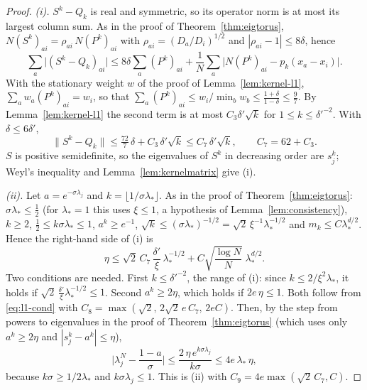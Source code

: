 \begin{proof}
\emph{(i).} $S^k-Q_k$ is real and symmetric, so its operator norm is at most its largest column sum. As in
the proof of Theorem~\ref{thm:eigtorus}, $N(S^k)_{ai}=\rho_{ai}\,N(P^k)_{ai}$ with
$\rho_{ai}=(D_a/D_i)^{1/2}$ and $|\rho_{ai}-1|\le8\delta$, hence
\[
 \sum_a\big|(S^k-Q_k)_{ai}\big|\le8\delta\sum_a(P^k)_{ai}+\frac1N\sum_a\big|N(P^k)_{ai}-p_k(x_a-x_i)\big| .
\]
With the stationary weight $w$ of the proof of Lemma~\ref{lem:kernel-l1}, $\sum_aw_a(P^k)_{ai}=w_i$, so
that $\sum_a(P^k)_{ai}\le w_i/\min_bw_b\le\frac{1+\delta}{1-\delta}\le\frac97$. By
Lemma~\ref{lem:kernel-l1} the second term is at most $C_3\delta'\sqrt k$ for $1\le k\le\delta'^{-2}$. With
$\delta\le6\delta'$,
\[
 \|S^k-Q_k\|\le\tfrac{72}7\,\delta+C_3\,\delta'\sqrt k\le C_7\,\delta'\sqrt k,\qquad C_7=62+C_3 .
\]
$S$ is positive semidefinite, so the eigenvalues of $S^k$ in decreasing order are $s_j^k$; Weyl's inequality
and Lemma~\ref{lem:kernelmatrix} give (i).

\emph{(ii).} Let $a=e^{-\sigma\lambda_j}$ and $k=\lfloor1/\sigma\lambda_*\rfloor$. As in the proof of
Theorem~\ref{thm:eigtorus}: $\sigma\lambda_*\le\frac12$ (for $\lambda_*=1$ this uses $\xi\le1$, a hypothesis of Lemma~\ref{lem:consistency}), $k\ge2$, $\frac12\le k\sigma\lambda_*\le1$,
$a^k\ge e^{-1}$, $\sqrt k\le(\sigma\lambda_*)^{-1/2}=\sqrt2\,\xi^{-1}\lambda_*^{-1/2}$ and $m_k\le C\lambda_*^{d/2}$. Hence
the right-hand side of (i) is
\[
 \eta\le\sqrt2\,C_7\,\frac{\delta'}\xi\,\lambda_*^{-1/2}+C\sqrt{\frac{\log N}N}\;\lambda_*^{d/2}.
\]
Two conditions are needed. First $k\le\delta'^{-2}$, the range of (i): since $k\le2/\xi^2\lambda_*$, it holds
if $\sqrt2\,\frac{\delta'}\xi\lambda_*^{-1/2}\le1$. Second $a^k\ge2\eta$, which holds if $2e\,\eta\le1$. Both
follow from \eqref{eq:l1-cond} with $C_8=\max(\sqrt2,\,2\sqrt2\,e\,C_7,\,2eC)$. Then, by the step from
powers to eigenvalues in the proof of Theorem~\ref{thm:eigtorus} (which uses only $a^k\ge2\eta$ and
$|s_j^k-a^k|\le\eta$),
\[
 \Big|\lambda^N_j-\frac{1-a}\sigma\Big|\le\frac{2\,\eta\,e^{k\sigma\lambda_j}}{k\sigma}\le4e\,\lambda_*\,\eta ,
\]
because $k\sigma\ge1/2\lambda_*$ and $k\sigma\lambda_j\le1$. This is (ii) with $C_9=4e\max(\sqrt2\,C_7,C)$.
\end{proof}

